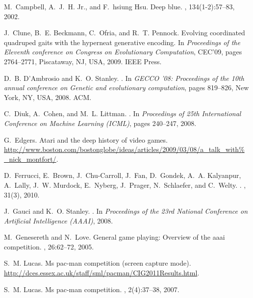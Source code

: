 \documentclass{sig-alternate}
\begin{document}
\begin{thebibliography}{10}

M.~Campbell, A.~J.~H. Jr., and F.~hsiung Hsu.
\newblock Deep blue.
, 134(1-2):57--83, 2002.

J.~Clune, B.~E. Beckmann, C.~Ofria, and R.~T. Pennock.
\newblock Evolving coordinated quadruped gaits with the hyperneat generative
  encoding.
\newblock In {\em Proceedings of the Eleventh conference on Congress on
  Evolutionary Computation}, CEC'09, pages 2764--2771, Piscataway, NJ, USA,
  2009. IEEE Press.

D.~B. D'Ambrosio and K.~O. Stanley.
.
\newblock In {\em GECCO '08: Proceedings of the 10th annual conference on
  Genetic and evolutionary computation}, pages 819--826, New York, NY, USA,
  2008. ACM.

C.~Diuk, A.~Cohen, and M.~L. Littman.
.
\newblock In {\em Proceedings of 25th International Conference on Machine
  Learning (ICML)}, pages 240--247, 2008.

G.~Edgers.
\newblock Atari and the deep history of video games.
\newblock
  \url{http://www.boston.com/bostonglobe/ideas/articles/2009/03/08/a_talk_with%
_nick_montfort/}.

\vfill\eject

D.~Ferrucci, E.~Brown, J.~Chu-Carroll, J.~Fan, D.~Gondek, A.~A. Kalyanpur,
  A.~Lally, J.~W. Murdock, E.~Nyberg, J.~Prager, N.~Schlaefer, and C.~Welty.
.
, 31(3), 2010.

J.~Gauci and K.~O. Stanley.
.
\newblock In {\em Proceedings of the 23rd National Conference on Artificial
  Intelligence (AAAI)}, 2008.

M.~Genesereth and N.~Love.
\newblock General game playing: Overview of the aaai competition.
, 26:62--72, 2005.

S.~M. Lucas.
\newblock Ms pac-man competition (screen capture mode).
\newblock \url{http://dces.essex.ac.uk/staff/sml/pacman/CIG2011Results.html}.

S.~M. Lucas.
\newblock Ms pac-man competition.
, 2(4):37--38, 2007.


\end{thebibliography}
\end{document}
